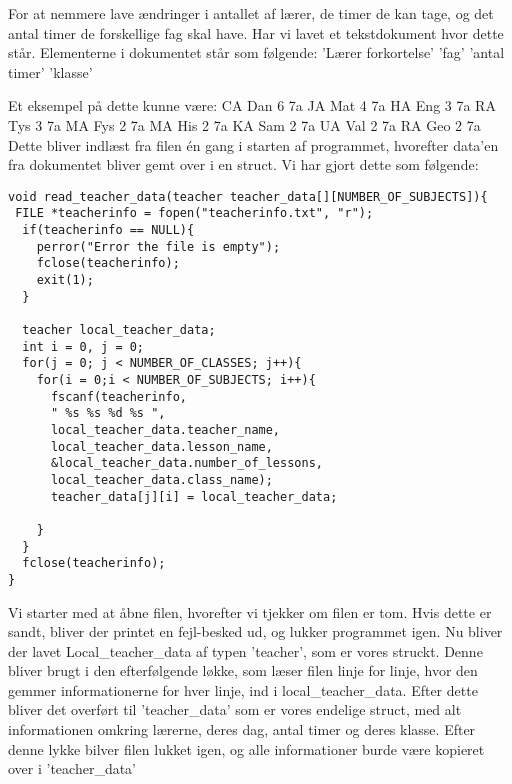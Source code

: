 For at nemmere lave ændringer i antallet af lærer, de timer de kan tage, og det antal timer de forskellige fag skal have. Har vi lavet et tekstdokument hvor dette står. 
Elementerne i dokumentet står som følgende:
’Lærer forkortelse’ ’fag’ ’antal timer’ ’klasse’

Et eksempel på dette kunne være:
    CA Dan 6 7a
    JA Mat 4 7a
    HA Eng 3 7a
    RA Tys 3 7a
    MA Fys 2 7a
    MA His 2 7a
    KA Sam 2 7a
    UA Val 2 7a
    RA Geo 2 7a
Dette bliver indlæst fra filen én gang i starten af programmet, hvorefter data’en fra dokumentet bliver gemt over i en struct.
Vi har gjort dette som følgende:
\begin{lstlisting}
void read_teacher_data(teacher teacher_data[][NUMBER_OF_SUBJECTS]){
 FILE *teacherinfo = fopen("teacherinfo.txt", "r");
  if(teacherinfo == NULL){
    perror("Error the file is empty");
    fclose(teacherinfo);
    exit(1);
  }

  teacher local_teacher_data;
  int i = 0, j = 0;
  for(j = 0; j < NUMBER_OF_CLASSES; j++){
    for(i = 0;i < NUMBER_OF_SUBJECTS; i++){
      fscanf(teacherinfo,
      " %s %s %d %s ",
      local_teacher_data.teacher_name, 
      local_teacher_data.lesson_name, 
      &local_teacher_data.number_of_lessons, 
      local_teacher_data.class_name);
      teacher_data[j][i] = local_teacher_data; 
  
    } 
  }  
  fclose(teacherinfo);
}
\end{lstlisting}
Vi starter med at åbne filen, hvorefter vi tjekker om filen er tom. Hvis dette er sandt, bliver der printet en fejl-besked ud, og lukker programmet igen.
Nu bliver der lavet Local\_teacher\_data af typen ’teacher’, som er vores struckt. Denne bliver brugt i den efterfølgende løkke, som læser filen linje for linje, hvor den gemmer informationerne for hver linje, ind i local\_teacher\_data. Efter dette bliver det overført til ’teacher\_data’ som er vores endelige struct, med alt informationen omkring lærerne, deres dag, antal timer og deres klasse. 
Efter denne lykke bilver filen lukket igen, og alle informationer burde være kopieret over i ’teacher\_data’